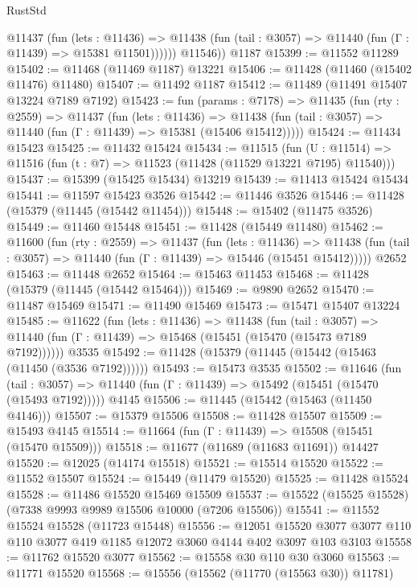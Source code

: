 \begin{lexlean}{RustStd}
\begin{coremodule}
            @11437
              (fun (lets : @11436) =>
              @11438 (fun (tail : @3057) => @11440 (fun (Γ : @11439) => @15381 @11501))))))
        @11546))
    @1187
@15399 := @11552 @11289
@15402 := @11468 (@11469 @1187) @13221
@15406 := @11428 (@11460 (@15402 @11476) @11480)
@15407 := @11492 @1187
@15412 := @11489 (@11491 @15407 @13224 @7189 @7192)
@15423 := fun (params : @7178) =>
  @11435
    (fun (rty : @2559) =>
    @11437
      (fun (lets : @11436) =>
      @11438 (fun (tail : @3057) => @11440 (fun (Γ : @11439) => @15381 (@15406 @15412)))))
@15424 := @11434 @15423
@15425 := @11432 @15424
@15434 := @11515
    (fun (U : @11514) => @11516 (fun (t : @7) => @11523 (@11428 (@11529 @13221 @7195) @11540)))
@15437 := @15399 (@15425 @15434) @13219
@15439 := @11413 @15424 @15434
@15441 := @11597 @15423 @3526
@15442 := @11446 @3526
@15446 := @11428 (@15379 (@11445 (@15442 @11454)))
@15448 := @15402 (@11475 @3526)
@15449 := @11460 @15448
@15451 := @11428 (@15449 @11480)
@15462 := @11600
    (fun (rty : @2559) =>
    @11437
      (fun (lets : @11436) =>
      @11438 (fun (tail : @3057) => @11440 (fun (Γ : @11439) => @15446 (@15451 @15412)))))
    @2652
@15463 := @11448 @2652
@15464 := @15463 @11453
@15468 := @11428 (@15379 (@11445 (@15442 @15464)))
@15469 := @9890 @2652
@15470 := @11487 @15469
@15471 := @11490 @15469
@15473 := @15471 @15407 @13224
@15485 := @11622
    (fun (lets : @11436) =>
    @11438
      (fun (tail : @3057) =>
      @11440 (fun (Γ : @11439) => @15468 (@15451 (@15470 (@15473 @7189 @7192))))))
    @3535
@15492 := @11428 (@15379 (@11445 (@15442 (@15463 (@11450 (@3536 @7192))))))
@15493 := @15473 @3535
@15502 := @11646
    (fun (tail : @3057) => @11440 (fun (Γ : @11439) => @15492 (@15451 (@15470 (@15493 @7192)))))
    @4145
@15506 := @11445 (@15442 (@15463 (@11450 @4146)))
@15507 := @15379 @15506
@15508 := @11428 @15507
@15509 := @15493 @4145
@15514 := @11664 (fun (Γ : @11439) => @15508 (@15451 (@15470 @15509)))
@15518 := @11677 (@11689 (@11683 @11691)) @14427
@15520 := @12025 (@14174 @15518)
@15521 := @15514 @15520
@15522 := @11552 @15507
@15524 := @15449 (@11479 @15520)
@15525 := @11428 @15524
@15528 := @11486 @15520 @15469 @15509
@15537 := @15522 (@15525 @15528) (@7338 @9993 @9989 @15506 @10000 (@7206 @15506))
@15541 := @11552 @15524 @15528 (@11723 @15448)
@15556 := @12051
    @15520
    @3077
    @3077
    @110
    @110
    @3077
    @419
    @1185
    @12072
    @3060
    @4144
    @402
    @3097
    @103
    @3103
@15558 := @11762 @15520 @3077
@15562 := @15558 @30 @110 @30 @3060
@15563 := @11771 @15520
@15568 := @15556 (@15562 (@11770 (@15563 @30)) @11781)

\end{coremodule}
\end{lexlean}
